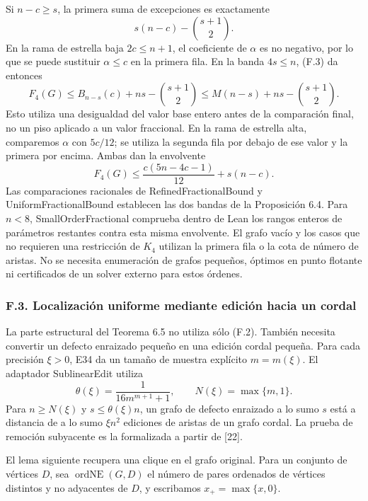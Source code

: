 \documentclass[spanish,11pt,a4paper]{article}
\begin{document}
Si \(n-c\ge s\), la primera suma de excepciones es exactamente \[
s(n-c)-\binom{s+1}{2}.
\tag{F.3}
\] En la rama de estrella baja \(2c\le n+1\), el coeficiente de \(\alpha\) es no negativo, por lo que se puede sustituir \(\alpha\le c\) en la primera fila. En la banda \(4s\le n\), (F.3) da entonces \[
F_4(G)\le B_{n-s}(c)+ns-\binom{s+1}{2}
\le M(n-s)+ns-\binom{s+1}{2}.
\] Esto utiliza una desigualdad del valor base entero antes de la comparación final, no un piso aplicado a un valor fraccional. En la rama de estrella alta, comparemos \(\alpha\) con \(5c/12\); se utiliza la segunda fila por debajo de ese valor y la primera por encima. Ambas dan la envolvente \[
F_4(G)\le\frac{c(5n-4c-1)}{12}+s(n-c).
\tag{F.4}
\] Las comparaciones racionales de {\ttfamily\small RefinedFract\discretionary{\hbox{\ensuremath{\hookrightarrow}}}{}{}ionalBound} y {\ttfamily\small UniformFract\discretionary{\hbox{\ensuremath{\hookrightarrow}}}{}{}ionalBound} establecen las dos bandas de la Proposición 6.4. Para \(n<8\), {\ttfamily\small SmallOrderFr\discretionary{\hbox{\ensuremath{\hookrightarrow}}}{}{}actional} comprueba dentro de Lean los rangos enteros de parámetros restantes contra esta misma envolvente. El grafo vacío y los casos que no requieren una restricción de \(K_4\) utilizan la primera fila o la cota de número de aristas. No se necesita enumeración de grafos pequeños, óptimos en punto flotante ni certificados de un solver externo para estos órdenes.

\subsubsection{F.3. Localización uniforme mediante edición hacia un cordal}\label{f.3.-localizacion-uniforme-mediante-edicion-hacia-un-cordal}

La parte estructural del Teorema 6.5 no utiliza sólo (F.2). También necesita convertir un defecto enraizado pequeño en una edición cordal pequeña. Para cada precisión \(\xi>0\), E34 da un tamaño de muestra explícito \(m=m(\xi)\). El adaptador {\ttfamily\small SublinearEdi\discretionary{\hbox{\ensuremath{\hookrightarrow}}}{}{}t} utiliza \[
\theta(\xi)=\frac1{16m^{m+1}+1},\qquad N(\xi)=\max\{m,1\}.
\tag{F.5}
\] Para \(n\ge N(\xi)\) y \(s\le\theta(\xi)n\), un grafo de defecto enraizado a lo sumo \(s\) está a distancia de a lo sumo \(\xi n^2\) ediciones de aristas de un grafo cordal. La prueba de remoción subyacente es la formalizada a partir de {[}22{]}.

El lema siguiente recupera una clique en el grafo original. Para un conjunto de vértices \(D\), sea \(\operatorname{ordNE}(G,D)\) el número de pares ordenados de vértices distintos y no adyacentes de \(D\), y escribamos \(x_+=\max\{x,0\}\).
\end{document}
